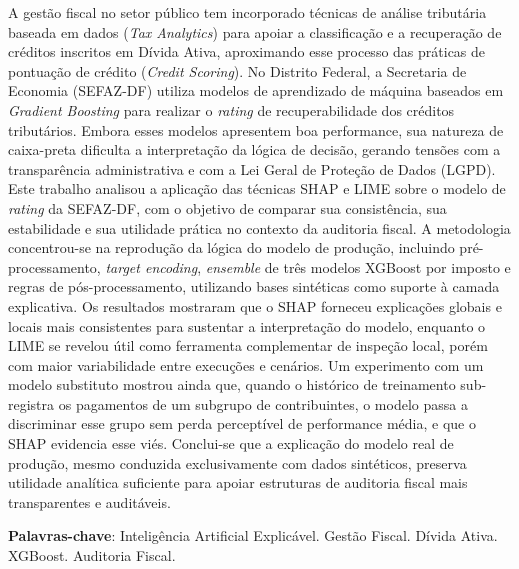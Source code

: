 \begin{resumo}

 A gestão fiscal no setor público tem incorporado técnicas de análise tributária baseada em dados (\textit{Tax Analytics}) para apoiar a classificação e a recuperação de créditos inscritos em Dívida Ativa, aproximando esse processo das práticas de pontuação de crédito (\textit{Credit Scoring}). No Distrito Federal, a Secretaria de Economia (SEFAZ-DF) utiliza modelos de aprendizado de máquina baseados em \textit{Gradient Boosting} para realizar o \textit{rating} de recuperabilidade dos créditos tributários. Embora esses modelos apresentem boa performance, sua natureza de caixa-preta dificulta a interpretação da lógica de decisão, gerando tensões com a transparência administrativa e com a Lei Geral de Proteção de Dados (LGPD). Este trabalho analisou a aplicação das técnicas SHAP e LIME sobre o modelo de \textit{rating} da SEFAZ-DF, com o objetivo de comparar sua consistência, sua estabilidade e sua utilidade prática no contexto da auditoria fiscal. A metodologia concentrou-se na reprodução da lógica do modelo de produção, incluindo pré-processamento, \textit{target encoding}, \textit{ensemble} de três modelos XGBoost por imposto e regras de pós-processamento, utilizando bases sintéticas como suporte à camada explicativa. Os resultados mostraram que o SHAP forneceu explicações globais e locais mais consistentes para sustentar a interpretação do modelo, enquanto o LIME se revelou útil como ferramenta complementar de inspeção local, porém com maior variabilidade entre execuções e cenários. Um experimento com um modelo substituto mostrou ainda que, quando o histórico de treinamento sub-registra os pagamentos de um subgrupo de contribuintes, o modelo passa a discriminar esse grupo sem perda perceptível de performance média, e que o SHAP evidencia esse viés. Conclui-se que a explicação do modelo real de produção, mesmo conduzida exclusivamente com dados sintéticos, preserva utilidade analítica suficiente para apoiar estruturas de auditoria fiscal mais transparentes e auditáveis.

 \vspace{\onelineskip}
    
 \noindent
 \textbf{Palavras-chave}: Inteligência Artificial Explicável. Gestão Fiscal. Dívida Ativa. XGBoost. Auditoria Fiscal.
\end{resumo}
